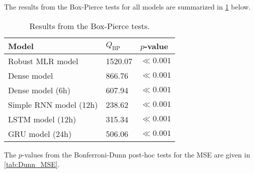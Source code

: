 \label{chapt:appendix_C}

The results from the Box-Pierce tests for all models are summarized in \cref{tab:boxpierce} below. 
\begin{table}[h]
\small
\centering
\caption{Results from the Box-Pierce tests.}
\label{tab:boxpierce}
\begin{tabular}{@{}lll@{}}
\toprule
Model                  & $Q_{\text{BP}}$ & $p$-value             \\ \midrule
Robust MLR model       & 1520.07         & $\ll0.001$ \\
Dense model            & 866.76          & $\ll0.001$  \\
Dense model (6h)       & 607.94          & $\ll0.001$ \\
Simple RNN model (12h) & 238.62          & $\ll0.001$  \\
LSTM model (12h)       & 315.34          & $\ll0.001$  \\
GRU model (24h)        & 506.06          & $\ll0.001$ \\ \bottomrule
\end{tabular}
\end{table}

\noindent
The $p$-values from the Bonferroni-Dunn post-hoc tests for the MSE are given in \cref{tab:Dunn_MSE}. 

\begin{table}[h]
\centering
\caption{$p$-values for the pairwise comparisons from the Bonferroni-Dunn post-hoc test for the MSE. }
\label{tab:Dunn_MSE}
\end{table}

